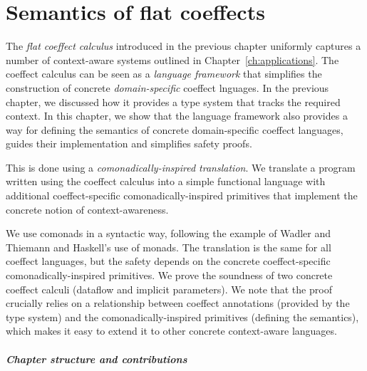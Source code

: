 
\chapter{Semantics of flat coeffects}
\label{ch:semantics}

The \emph{flat coeffect calculus} introduced in the previous chapter uniformly captures a number
of context-aware systems outlined in Chapter~\ref{ch:applications}. The coeffect calculus
can be seen as a \emph{language framework} that simplifies the construction of concrete
\emph{domain-specific} coeffect lnguages. In the previous chapter, we discussed how it provides a
type system that tracks the required context. In this chapter, we show that the language framework
also provides a way for defining the semantics of concrete domain-specific coeffect languages,
guides their implementation and simplifies safety proofs.

This is done using a \emph{comonadically-inspired translation}. We translate a program written
using the coeffect calculus into a simple functional language with additional coeffect-specific
comonadically-inspired primitives that implement the concrete notion of context-awareness.

We use comonads in a syntactic way, following the example of Wadler and Thiemann \cite{monads-effects-marriage}
and Haskell's use of monads. The translation is the same for all coeffect languages, but the safety
depends on the concrete coeffect-specific comonadically-inspired primitives. We prove the soundness
of two concrete coeffect calculi (dataflow and implicit parameters). We note that the proof
crucially relies on a relationship between coeffect annotations (provided by the type system) and
the comonadically-inspired primitives (defining the semantics), which makes it easy to extend it to
other concrete context-aware languages.

\paragraph{Chapter structure and contributions}

